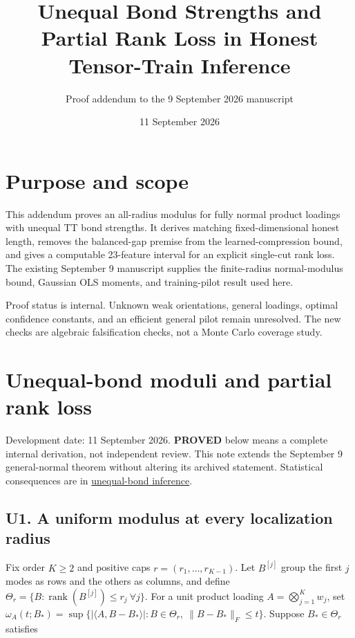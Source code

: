 \documentclass[
  11pt,
]{article}
\title{Unequal Bond Strengths and Partial Rank Loss in Honest
Tensor-Train Inference}
\subtitle{Proof addendum to the 9 September 2026 manuscript}
\author{}
\date{11 September 2026}
\begin{document}
\maketitle

{
\setcounter{tocdepth}{2}
\tableofcontents
}
\section{Purpose and scope}\label{purpose-and-scope}

This addendum proves an all-radius modulus for fully normal product
loadings with unequal TT bond strengths. It derives matching
fixed-dimensional honest length, removes the balanced-gap premise from
the learned-compression bound, and gives a computable 23-feature
interval for an explicit single-cut rank loss. The existing September 9
manuscript supplies the finite-radius normal-modulus bound, Gaussian OLS
moments, and training-pilot result used here.

Proof status is internal. Unknown weak orientations, general loadings,
optimal confidence constants, and an efficient general pilot remain
unresolved. The new checks are algebraic falsification checks, not a
Monte Carlo coverage study.

\newpage

\section{Unequal-bond moduli and partial rank
loss}\label{unequal-bond-moduli-and-partial-rank-loss}

Development date: 11 September 2026. \textbf{PROVED} below means a
complete internal derivation, not independent review. This note extends
the September 9 general-normal theorem without altering its archived
statement. Statistical consequences are in
\href{../../theory/unequal_bond_inference.md}{unequal-bond inference}.

\subsection{U1. A uniform modulus at every localization
radius}\label{u1.-a-uniform-modulus-at-every-localization-radius}

Fix order \(K\ge2\) and positive caps \(r=(r_1,\ldots,r_{K-1})\). Let
\(B^{[j]}\) group the first \(j\) modes as rows and the others as
columns, and define
\(\Theta_r=\{B:\operatorname{rank}(B^{[j]})\le r_j\ \forall j\}\). For a
unit product loading \(A=\bigotimes_{j=1}^K w_j\), set
\(\omega_A(t;B_*)=\sup\{|\langle A,B-B_*\rangle|:B\in\Theta_r,\ \|B-B_*\|_F\le t\}\).
Suppose \(B_*\in\Theta_r\) satisfies
\end{document}

